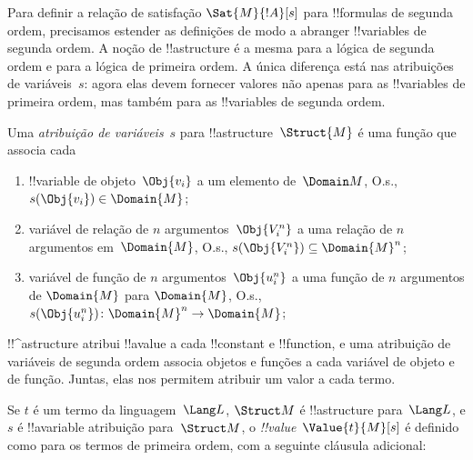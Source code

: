 \documentclass[../../../include/open-logic-section]{subfiles}
\begin{document}


\begin{explain}
Para definir a relação de satisfação $\Sat{M}{!A}[s]$ para !!{formula}s de
segunda ordem, precisamos estender as definições de modo a abranger
!!{variable}s de segunda ordem. A noção de !!a{structure} é a mesma para a
lógica de segunda ordem e para a lógica de primeira ordem. A única diferença
está nas atribuições de variáveis~$s$: agora elas devem fornecer valores não
apenas para as !!{variable}s de primeira ordem, mas também para as
!!{variable}s de segunda ordem.
\end{explain}

\begin{defn}
Uma \emph{atribuição de variáveis}~$s$ para !!a{structure}~$\Struct{M}$ é
uma função que associa cada
\begin{enumerate}
\item !!{variable} de objeto~$\Obj{v_i}$ a um elemento de~$\Domain M$,
  O.s.\@, $s(\Obj{v_i}) \in \Domain{M}$;
\item variável de relação de $n$ argumentos~$\Obj{V_i^n}$ a uma relação de
  $n$ argumentos em~$\Domain{M}$, O.s.\@,
  $s(\Obj{V_i^n}) \subseteq \Domain{M}^n$;
\item variável de função de $n$ argumentos~$\Obj{u_i^n}$ a uma função de
  $n$ argumentos de $\Domain{M}$ para $\Domain{M}$, O.s.\@,
  $s(\Obj{u_i^n})\colon \Domain{M}^n \to \Domain{M}$;
\end{enumerate}
\end{defn}

\begin{explain}
!!^a{structure} atribui !!a{value} a cada !!{constant} e !!{function}, e
uma atribuição de variáveis de segunda ordem associa objetos e funções a
cada variável de objeto e de função. Juntas, elas nos permitem atribuir um
valor a cada termo.
\end{explain}

\begin{defn}
Se $t$ é um termo da linguagem~$\Lang L$, $\Struct M$ é !!a{structure}
para~$\Lang L$, e $s$ é !!a{variable} atribuição para~$\Struct M$, o
\emph{!!{value}}~$\Value{t}{M}[s]$ é definido como para os termos de
primeira ordem, com a seguinte cláusula adicional:
\begin{quote}
\end{quote}
\end{defn}
\end{document}
